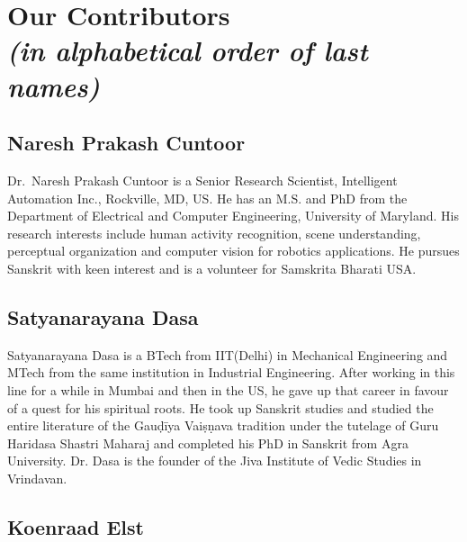 \makeatletter
\def\@makeschapterhead#1{%
  \vspace*{50\p@}%
  {\parindent \z@ \raggedright
    \normalfont
    \interlinepenalty\@M
    \LARGE \bfseries  #1\par\nobreak
    \vskip 20\p@
  }}
\makeatother

\chapter*{Our Contributors\\ {\rm\sl\small (in alphabetical order of last names)}}\label{contributors}

\lhead[\small\thepage]{}
\rhead[]{\small\thepage}
\chead[]{}
\cfoot[]{}



\section*{Naresh Prakash Cuntoor}

Dr.~Naresh Prakash Cuntoor is a Senior Research Scientist, Intelligent Automation Inc., Rockville, MD, US. He has an M.S. and PhD from the Department of Electrical and Computer Engineering, University of Maryland. His research interests include human activity recognition, scene understanding, perceptual organization and computer vision for robotics applications. He pursues Sanskrit with keen interest and is a volunteer for Samskrita Bharati USA.

\section*{Satyanarayana Dasa}

Satyanarayana Dasa is a BTech from IIT(Delhi) in Mechanical Engineering and MTech from the same institution in Industrial Engineering. After working in this line for a while in Mumbai and then in the US, he gave up that career in favour of a quest for his spiritual roots. He took up Sanskrit studies and studied the entire literature of the Gauḍīya Vaiṣṇava tradition under the tutelage of Guru Haridasa Shastri Maharaj and completed his PhD in Sanskrit from Agra University. Dr. Dasa is the founder of the Jiva Institute of Vedic Studies in Vrindavan.

\section*{Koenraad Elst}

